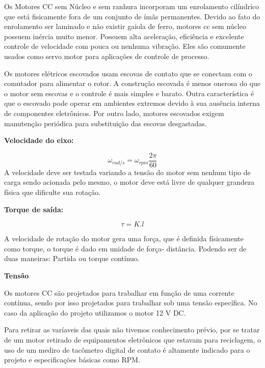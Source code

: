 Os Motores CC sem Núcleo e sem ranhura incorporam um enrolamento cilíndrico que está fisicamente fora de um conjunto de ímãs permanentes. Devido ao fato do enrolamento ser laminado e não existir gaiola de ferro, motores cc sem núcleo possuem inércia muito menor. Possuem alta aceleração, eficiência e excelente controle de velocidade com pouca ou nenhuma vibração. Eles são comumente usados como servo motor para aplicações de controle de processo.\cite{EspeciMotorCC}

Os motores elétricos escovados usam escovas de contato que se conectam com o comutador para alimentar o rotor. A construção escovada é menos onerosa do que o motor sem escovas e o controle é mais simples e barato. Outra característica é que o escovado pode operar em ambientes extremos devido à sua ausência interna de componentes eletrônicos. Por outro lado, motores escovados exigem manutenção periódica para substituição das escovas desgastadas.\cite{MotorCC}


\textbf{Velocidade do eixo:}


\begin{equation}
\omega_{rad/s} = \omega_{rpm} \frac{2 \pi}{60} 
\end{equation}
A velocidade deve ser testada variando a tensão do motor sem nenhum tipo de carga sendo acionada pelo mesmo, o motor deve está livre de qualquer grandeza física que dificulte sua rotação.


\textbf{Torque de saída:}

\begin{equation}
\tau = K. l 
\end{equation}

A velocidade de rotação do motor gera uma força, que é definida físicamente como torque, o torque é dado em unidade de força- distância. Podendo ser de duas maneiras: Partida ou torque contínuo. \cite{EspeciMotorCC}

\textbf{Tensão}

Os motores CC são projetados para trabalhar em função de uma corrente contínua, sendo por isso projetados para trabalhar sob uma tensão específica. No caso da aplicação do projeto utilizamos o motor 12 V DC.

Para retirar as varíaveis das quais não tivemos conhecimento prévio, por se tratar de um motor retirado de equipamentos eletrônicos que estavam para reciclagem, o uso de um mediro de tacômetro digital de contato é altamente indicado para o projeto e especificações básicas como RPM.\cite{EspeciMotorCC}


